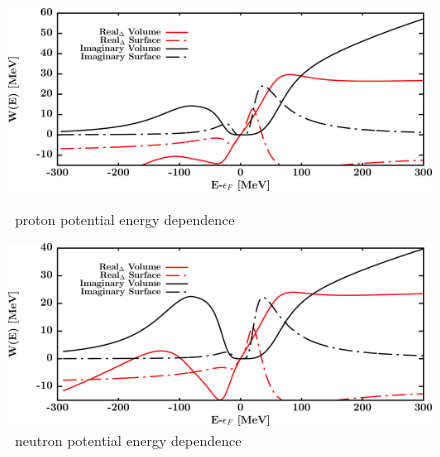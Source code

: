 \begin{figure}[hbtp]
    \centering
    \begin{minipage}{0.42\textwidth}
        \centering
        \includegraphics[width=\textwidth]{figures/sn112_protonPotentials.png}
        \caption*{\footnotesize\snTwelve\ proton potential energy dependence}
        \label{DOMFitData_sn112_proton_potentialComponent_energy}
    \end{minipage}\hspace{6pt}
    \begin{minipage}{0.42\textwidth}
        \centering
        \includegraphics[width=\textwidth]{figures/sn112_neutronPotentials.png}
        \caption*{\footnotesize\snTwelve\ neutron potential energy dependence}
        \label{DOMFitData_sn112_neutron_potentialComponent_energy}
    \end{minipage}
\end{figure}
